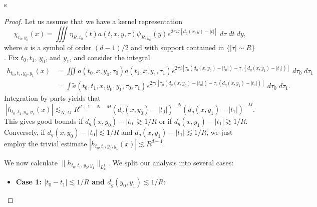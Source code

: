 \begin{lemma}
    s
\end{lemma}
\begin{proof}
    Let us assume that we have a kernel representation
    \[ \chi_{t_0,y_0}(x) = \iiint \eta_{R,t_0}(t) a(t,x,y,\tau) \psi_{R,y_0}(y) e^{2 \pi i \tau [ d_g(x,y) - |t| ]}\; d\tau\; dt\; dy, \]
    where $a$ is a symbol of order $(d-1)/2$ and with support contained in $\{ |\tau| \sim R \}$. Fix $t_0, t_1$, $y_0$, and $y_1$, and consider the integral
    \begin{align*}
        h_{t_0,t_1,y_0,y_1}(x) &= \iiint a(t_0,x,y_0,\tau_0) \overline{a(t_1,x,y_1,\tau_1)} e^{2 \pi i [ \tau_0 ( d_g(x,y_0) - |t_0| ) - \tau_1 ( d_g(x,y_1) - |t_1| ) ]}\; d\tau_0\; d\tau_1\\
        &= \int \tilde{a}(t_0,t_1,x,y_0,y_1,\tau_0,\tau_1) e^{2 \pi i [ \tau_0 ( d_g(x,y_0) - |t_0| ) - \tau_1 ( d_g(x,y_1) - |t_1| ) ]}\; d\tau_0\; d\tau_1 .
    \end{align*}
    Integration by parts yields that
    \[ |h_{t_0,t_1,y_0,y_1}(x)| \lesssim_{N,M} R^{d+1-N-M} (d_g(x,y_0) - |t_0| )^{-N} (d_g(x,y_1) - |t_1|)^{-M}. \]
    This gives good bounds if $d_g(x,y_0) - |t_0| \gtrsim 1/R$ or if $d_g(x,y_1) - |t_1| \gtrsim 1/R$. Conversely, if $d_g(x,y_0) - |t_0| \lesssim 1/R$ and $d_g(x,y_1) - |t_1| \lesssim 1/R$, we just employ the trivial estimate $|h_{t_0,t_1,y_0,y_1}(x)| \lesssim R^{d+1}$.

    We now  calculate $\| h_{t_0,t_1,y_0,y_1} \|_{L^1_x}$. We split our analysis into several cases:
    \begin{itemize}
        \item {\bf Case 1: $|t_0 - t_1| \lesssim 1/R$ and $d_g(y_0,y_1) \lesssim 1/R$}:


\end{itemize}
\end{proof}
